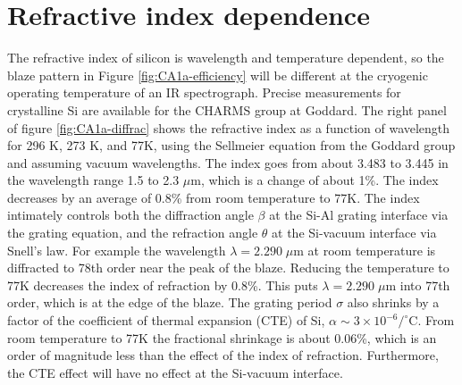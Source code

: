 \documentclass[]{spie}
\begin{document}
\section{Refractive index dependence}
The refractive index of silicon is wavelength and temperature dependent, so the blaze pattern in Figure \ref{fig:CA1a-efficiency} will be different at the cryogenic operating temperature of an IR spectrograph.  Precise measurements for crystalline Si are available for the CHARMS group at Goddard\cite{frey2006}.  The right panel of figure \ref{fig:CA1a-diffrac} shows the refractive index as a function of wavelength for 296 K, 273 K, and 77K, using the Sellmeier equation from the Goddard group and assuming vacuum wavelengths.  The index goes from about 3.483 to 3.445 in the wavelength range 1.5 to 2.3 $\mu$m, which is a change of about 1\%.  The index decreases by an average of 0.8\% from room temperature to 77K.  The index intimately controls both the diffraction angle $\beta$ at the Si-Al grating interface via the grating equation, and the refraction angle $\theta$ at the Si-vacuum interface via Snell's law.  For example the wavelength $\lambda=2.290 \;\mu$m at room temperature is diffracted to 78th order near the peak of the blaze.  Reducing the temperature to 77K decreases the index of refraction by 0.8\%. This puts $\lambda= 2.290 \;\mu $m into 77th order, which is at the edge of the blaze.  The grating period $\sigma$ also shrinks by a factor of the coefficient of thermal expansion (CTE) of Si, $\alpha \sim 3\times10^{-6}/^\circ$C.  From room temperature to 77K the fractional shrinkage is about 0.06\%, which is an order of magnitude less than the effect of the index of refraction.  Furthermore, the CTE effect will have no effect at the Si-vacuum interface.
\end{document}
